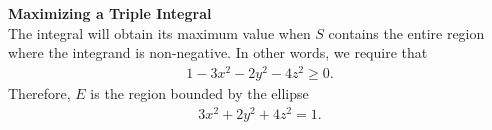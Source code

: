 \item %
\textbf{Maximizing a Triple Integral}\\
The integral will obtain its maximum value when $S$ contains the entire region where the integrand is non-negative. In other words, we require that 
\begin{align*}
  1 - 3x^2 - 2y^2 - 4z^2 \ge 0 .
\end{align*}
Therefore, $E$ is the region bounded by the ellipse
\begin{align*}
   3x^2 + 2y^2 + 4z^2 = 1.
\end{align*}
\EEN %
%

